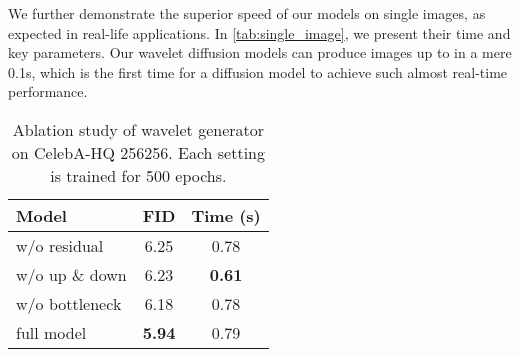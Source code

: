 \documentclass[10pt,twocolumn,letterpaper]{article}
\begin{document}
We further demonstrate the superior speed of our models on single images, as expected in real-life applications. In \cref{tab:single_image}, we present their time and key parameters. Our wavelet diffusion models can produce images up to  in a mere 0.1s, which is the first time for a diffusion model to achieve such almost real-time performance. 










\begin{table}[t]
  \centering
  \begin{tabular}{l |c c }
    \toprule
    Model & FID & Time (s) \\
    \midrule
    w/o residual &6.25 & 0.78 \\
    w/o up \& down & 6.23 & \textbf{0.61} \\
    w/o bottleneck & 6.18 & 0.78 \\
    full model &\textbf{5.94} & 0.79 \\
    \bottomrule
  \end{tabular}
   \vspace{-1mm}
  \caption{Ablation study of wavelet generator on CelebA-HQ 256256. Each setting is trained for 500 epochs.} 
\vspace{-3mm}
  \label{tab:ablation_425(500)_wgen}
\end{table}

\begin{table}[t]
  \centering
   \vspace{-2mm}
  \caption{Running time when using our full model to generate a single image on each benchmark set.}
  \label{tab:single_image}
\end{table}
\end{document}
